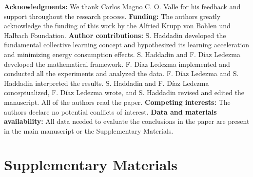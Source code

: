 \documentclass[12pt]{article}
\begin{document}
\textbf{Acknowledgments:}
We thank Carlos Magno C. O. Valle for his feedback and support throughout the research process. \textbf{Funding:} The authors greatly acknowledge the funding of this work by the Alfried Krupp von Bohlen und Halbach Foundation. \textbf{Author contributions:} S. Haddadin developed the fundamental collective learning concept and hypothesized its learning acceleration and minimizing energy consumption effects.  S. Haddadin and F. Díaz Ledezma developed the mathematical framework. F. Díaz Ledezma implemented and conducted all the experiments and analyzed the data. F. Díaz Ledezma and S. Haddadin interpreted the results. S. Haddadin and F. Díaz Ledezma conceptualized, F. Díaz Ledezma wrote, and S. Haddadin revised and edited the manuscript. All of the authors read the paper. \textbf{Competing interests:} The authors declare no potential conflicts of interest. \textbf{Data and materials availability:} All data needed to evaluate the conclusions in the paper are present in the main manuscript or the Supplementary Materials. %

 \newpage
 \beginsupplement
 \section*{Supplementary Materials}\label{sec:supplementary_materials}
 
\end{document}
